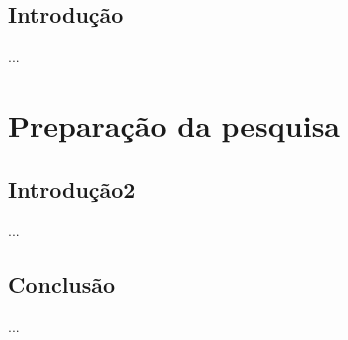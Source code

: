 \documentclass[
	12pt,
	a4paper,
	twoside, %
    english
	]{abntex2}
\begin{document}
\frenchspacing  %

\iffalse
\imprimircapa
\imprimirfolhaderosto* %






\fi




\textual

\chapter{Introdução}

...

\part{Preparação da pesquisa}

\chapter{Introdução2}

...

\chapter{Conclusão}

...




\postextual




\begin{apendicesenv}

\partapendices %

\end{apendicesenv}


%
%


\end{document}
